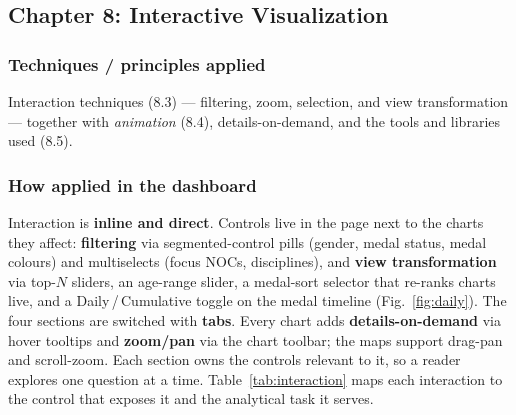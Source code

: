 \documentclass[11pt]{article}
\newcommand{\applied}{\subsubsection*{\color{teal}Techniques / principles applied}}
\newcommand{\howapplied}{\subsubsection*{\color{ocean}How applied in the dashboard}}
\begin{document}
\subsection{Chapter 8: Interactive Visualization}
\applied
\begin{techbox}
Interaction techniques (8.3) --- filtering, zoom, selection, and view transformation
--- together with \emph{animation} (8.4), details-on-demand, and the tools and
libraries used (8.5).
\end{techbox}
\howapplied
Interaction is \textbf{inline and direct}. Controls live in the
page next to the charts they affect: \textbf{filtering} via segmented-control
pills (gender, medal status, medal colours) and multiselects (focus NOCs,
disciplines), and \textbf{view transformation} via top-$N$ sliders, an age-range
slider, a medal-sort selector that re-ranks charts live, and a Daily\,/\,Cumulative
toggle on the medal timeline (Fig.~\ref{fig:daily}). The four sections are
switched with \textbf{tabs}. Every chart adds \textbf{details-on-demand}
via hover tooltips and \textbf{zoom/pan} via the chart toolbar; the maps support
drag-pan and scroll-zoom. Each section owns the controls relevant to it, so a
reader explores one question at a time. Table~\ref{tab:interaction} maps each
interaction to the control that exposes it and the analytical task it serves.
\end{document}
